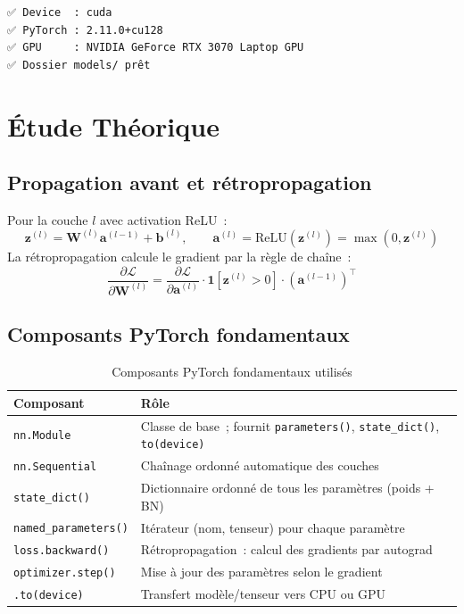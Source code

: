 \documentclass[12pt,a4paper]{report}
\begin{document}
\begin{outputbox}
\begin{verbatim}
✅ Device  : cuda
✅ PyTorch : 2.11.0+cu128
✅ GPU     : NVIDIA GeForce RTX 3070 Laptop GPU
✅ Dossier models/ prêt
\end{verbatim}
\end{outputbox}

\section{Étude Théorique}

\subsection{Propagation avant et rétropropagation}

\begin{formulebox}
Pour la couche $l$ avec activation ReLU~:
\[
  \mathbf{z}^{(l)} = \mathbf{W}^{(l)}\mathbf{a}^{(l-1)}
  + \mathbf{b}^{(l)},\qquad
  \mathbf{a}^{(l)} = \text{ReLU}(\mathbf{z}^{(l)}) = \max(0, \mathbf{z}^{(l)})
\]
La rétropropagation calcule le gradient par la règle de chaîne~:
\[
  \frac{\partial \mathcal{L}}{\partial \mathbf{W}^{(l)}}
  = \frac{\partial \mathcal{L}}{\partial \mathbf{a}^{(l)}}
    \cdot \mathbf{1}[\mathbf{z}^{(l)}>0]
    \cdot (\mathbf{a}^{(l-1)})^\top
\]
\end{formulebox}

\subsection{Composants PyTorch fondamentaux}

\begin{table}[H]
\centering
\caption{Composants PyTorch fondamentaux utilisés}
\begin{tabularx}{\textwidth}{lX}
\toprule
\textbf{Composant} & \textbf{Rôle} \\
\midrule
\texttt{nn.Module} & Classe de base~; fournit \texttt{parameters()}, \texttt{state\_dict()}, \texttt{to(device)} \\
\texttt{nn.Sequential} & Chaînage ordonné automatique des couches \\
\texttt{state\_dict()} & Dictionnaire ordonné de tous les paramètres (poids + BN) \\
\texttt{named\_parameters()} & Itérateur (nom, tenseur) pour chaque paramètre \\
\texttt{loss.backward()} & Rétropropagation~: calcul des gradients par autograd \\
\texttt{optimizer.step()} & Mise à jour des paramètres selon le gradient \\
\texttt{.to(device)} & Transfert modèle/tenseur vers CPU ou GPU \\
\bottomrule
\end{tabularx}
\end{table}
\end{document}
